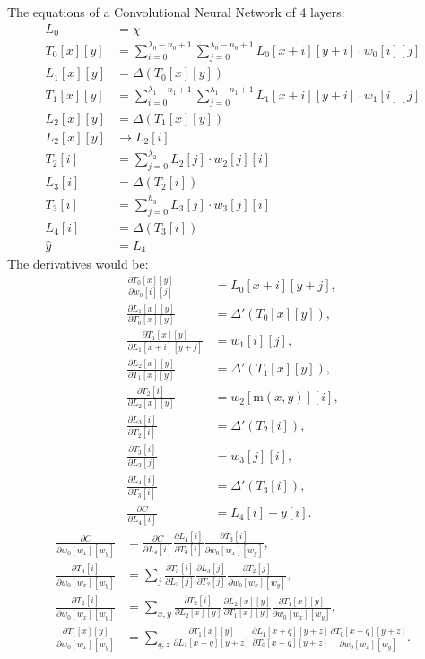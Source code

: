 \documentclass[12pt]{article}
\newcommand{\deriv}[2]{\frac{\partial #1}{\partial #2}}
\newcommand{\imgsize}[1]{\lambda_{#1} - n_{#1} + 1}
\newcommand{\m}{\text{m}}
\begin{document}
The equations of a Convolutional Neural Network of 4 layers:
\begin{align*}
	L_0 &= \chi \\
	T_0[x][y] &= \sum_{i=0}^{\imgsize{0}} \sum_{j=0}^{\imgsize{0}} L_0[x+i][y+i] \cdot w_0[i][j] \\
	L_1[x][y] &= \Delta(T_0[x][y]) \\
	T_1[x][y] &= \sum_{i=0}^{\imgsize{1}} \sum_{j=0}^{\imgsize{1}} L_1[x+i][y+i] \cdot w_1[i][j] \\
	L_2[x][y] &= \Delta(T_1[x][y]) \\
	L_2[x][y] &\rightarrow L_2[i] \\
	T_2[i] &= \sum_{j=0}^{\lambda_2} L_2[j] \cdot w_2[j][i] \\
	L_3[i] &= \Delta(T_2[i]) \\
	T_3[i] &= \sum_{j=0}^{h_3} L_3[j] \cdot w_3[j][i] \\
	L_4[i] &= \Delta(T_3[i]) \\
	\hat{y} &= L_4
\end{align*}
The derivatives would be:
\begin{align*}
	\deriv{T_0[x][y]}{w_0[i][j]} &= L_0[x+i][y+j], \\
	\deriv{L_1[x][y]}{T_0[x][y]} &= \Delta '(T_0[x][y]), \\
	\deriv{T_1[x][y]}{L_1[x+i][y+j]} &= w_1[i][j], \\
	\deriv{L_2[x][y]}{T_1[x][y]} &= \Delta '(T_1[x][y]), \\
	\deriv{T_2[i]}{L_2[x][y]} &= w_2[\m (x,y)][i], \\
	\deriv{L_3[i]}{T_2[i]} &= \Delta '(T_2[i]), \\
	\deriv{T_3[i]}{L_3[j]} &= w_3[j][i], \\
	\deriv{L_4[i]}{T_3[i]} &= \Delta '(T_3[i]), \\
	\deriv{C}{L_4[i]} &= L_4[i] - y[i].
\end{align*}
\begin{align*}
	\deriv{C}{w_0[w_x][w_y]} &= \deriv{C}{L_4[i]} \deriv{L_4[i]}{T_3[i]} \deriv{T_3[i]}{w_0[w_x][w_y]}, \\
	\deriv{T_3[i]}{w_0[w_x][w_y]} &= \sum_{j} \deriv{T_3[i]}{L_3[j]} \deriv{L_3[j]}{T_2[j]} \deriv{T_2[j]}{w_0[w_x][w_y]}, \\
	\deriv{T_2[i]}{w_0[w_x][w_y]} &= \sum_{x,y} \deriv{T_2[i]}{L_2[x][y]} \deriv{L_2[x][y]}{T_1[x][y]} \deriv{T_1[x][y]}{w_0[w_x][w_y]}, \\
	\deriv{T_1[x][y]}{w_0[w_x][w_y]} &= \sum_{q,z} \deriv{T_1[x][y]}{L_1[x + q][y + z]} \deriv{L_1[x + q][y + z]}{T_0[x + q][y + z]} \deriv{T_0[x + q][y + z]}{w_0[w_x][w_y]}.
\end{align*}
\end{document}
